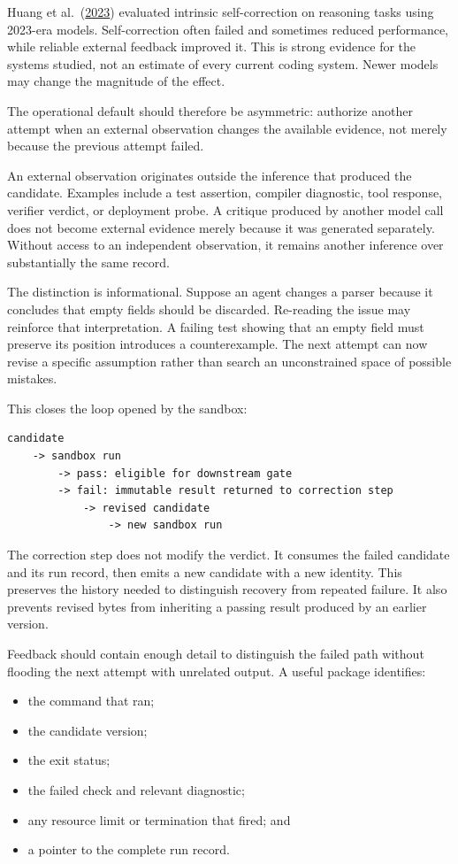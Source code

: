 Huang et al.~(\href{https://arxiv.org/abs/2310.01798}{2023}) evaluated intrinsic self-correction on reasoning tasks using 2023-era models. Self-correction often failed and sometimes reduced performance, while reliable external feedback improved it. This is strong evidence for the systems studied, not an estimate of every current coding system. Newer models may change the magnitude of the effect.

The operational default should therefore be asymmetric: authorize another attempt when an external observation changes the available evidence, not merely because the previous attempt failed.

An external observation originates outside the inference that produced the candidate. Examples include a test assertion, compiler diagnostic, tool response, verifier verdict, or deployment probe. A critique produced by another model call does not become external evidence merely because it was generated separately. Without access to an independent observation, it remains another inference over substantially the same record.

The distinction is informational. Suppose an agent changes a parser because it concludes that empty fields should be discarded. Re-reading the issue may reinforce that interpretation. A failing test showing that an empty field must preserve its position introduces a counterexample. The next attempt can now revise a specific assumption rather than search an unconstrained space of possible mistakes.

This closes the loop opened by the sandbox:

\begin{verbatim}
candidate
    -> sandbox run
        -> pass: eligible for downstream gate
        -> fail: immutable result returned to correction step
            -> revised candidate
                -> new sandbox run
\end{verbatim}

The correction step does not modify the verdict. It consumes the failed candidate and its run record, then emits a new candidate with a new identity. This preserves the history needed to distinguish recovery from repeated failure. It also prevents revised bytes from inheriting a passing result produced by an earlier version.

Feedback should contain enough detail to distinguish the failed path without flooding the next attempt with unrelated output. A useful package identifies:

\begin{itemize}
\tightlist
\item
  the command that ran;
\item
  the candidate version;
\item
  the exit status;
\item
  the failed check and relevant diagnostic;
\item
  any resource limit or termination that fired; and
\item
  a pointer to the complete run record.
\end{itemize}

